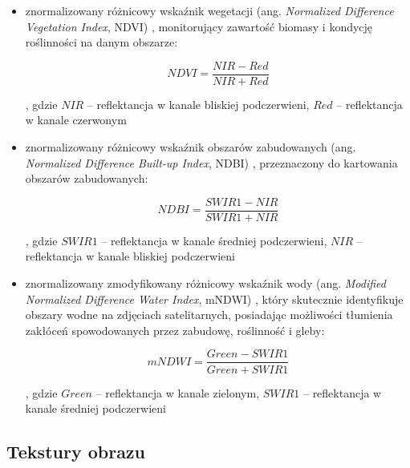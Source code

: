 \documentclass{amuthesis}
\begin{document}
\begin{itemize}
\item
  znormalizowany różnicowy wskaźnik wegetacji (ang. \emph{Normalized
  Difference Vegetation Index}, NDVI) \autocite{ndvi}, monitorujący
  zawartość biomasy i kondycję roślinności na danym obszarze:

  \[
  NDVI = \frac{NIR - Red}{NIR + Red}
  \]

  , gdzie \(NIR\) -- reflektancja w kanale bliskiej podczerwieni,
  \(Red\) -- reflektancja w kanale czerwonym
\item
  znormalizowany różnicowy wskaźnik obszarów zabudowanych (ang.
  \emph{Normalized Difference Built-up Index}, NDBI) \autocite{ndbi},
  przeznaczony do kartowania obszarów zabudowanych:

  \[
  NDBI = \frac{SWIR1 - NIR}{SWIR1 + NIR}
  \]

  , gdzie \(SWIR1\) -- reflektancja w kanale średniej podczerwieni,
  \(NIR\) -- reflektancja w kanale bliskiej podczerwieni
\item
  znormalizowany zmodyfikowany różnicowy wskaźnik wody (ang.
  \emph{Modified Normalized Difference Water Index}, mNDWI)
  \autocite{mndwi}, który skutecznie identyfikuje obszary wodne na
  zdjęciach satelitarnych, posiadając możliwości tłumienia zakłóceń
  spowodowanych przez zabudowę, roślinność i gleby:

  \[
  mNDWI = \frac{Green - SWIR1}{Green + SWIR1}
  \]

  , gdzie \(Green\) -- reflektancja w kanale zielonym, \(SWIR1\) --
  reflektancja w kanale średniej podczerwieni
\end{itemize}

\hypertarget{sec-textures}{%
\subsection{Tekstury obrazu}\label{sec-textures}}
\end{document}
